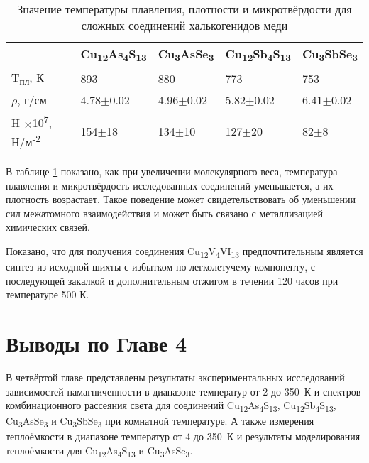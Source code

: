 \begin{table} [htbp]%
    \centering
	\caption{Значение температуры плавления, плотности и микротвёрдости для сложных соединений халькогенидов меди}%
	\label{hard}%
    \renewcommand{\arraystretch}{1.5}
	\begin{tabular}{@{}@{\extracolsep{20pt}}lllll@{}}
        \toprule     %
    	 & Cu\textsubscript{12}As\textsubscript{4}S\textsubscript{13} &Cu\textsubscript{3}AsSe\textsubscript{3}& Cu\textsubscript{12}Sb\textsubscript{4}S\textsubscript{13} &Cu\textsubscript{3}SbSe\textsubscript{3}	\\
        \midrule
    T\textsubscript{пл}, К & 893 & 880												& 773& 753	\\ \hline
    	$ \rho$, г/см 	&  4.78$\pm$0.02	 						& 4.96$\pm$0.02												&5.82$\pm$0.02 	& 6.41$\pm$0.02 \\ \hline
    	H $\times$10\textsuperscript{7}, Н/м\textsuperscript{-2} 	& 154$\pm$18	 						& 134$\pm$10 	& 127$\pm$20			& 82$\pm$8	\\ \hline

        \bottomrule
	\end{tabular}%
\end{table}
В таблице \ref{hard} показано, как при увеличении молекулярного веса, температура плавления и микротвёрдость исследованных соединений уменьшается, а их плотность возрастает. Такое поведение может свидетельствовать об уменьшении сил межатомного взаимодействия и может быть связано с металлизацией химических
связей.

Показано, что для получения соединения Cu\textsubscript{12}V\textsubscript{4}VI\textsubscript{13} предпочтительным является синтез из
исходной шихты с избытком по легколетучему компоненту, с последующей закалкой и
дополнительным отжигом в течении 120 часов при температуре 500 К.
\clearpage

\newpage

\section{Выводы по Главе 4} \label{sect4_5}

В четвёртой главе представлены результаты экспериментальных исследований зависимостей намагниченности в диапазоне температур от 2 до 350~К и спектров комбинационного рассеяния света для соединений Cu\textsubscript{12}As\textsubscript{4}S\textsubscript{13}, Cu\textsubscript{12}Sb\textsubscript{4}S\textsubscript{13}, Cu\textsubscript{3}AsSe\textsubscript{3} и Cu\textsubscript{3}SbSe\textsubscript{3} при комнатной температуре. А также измерения теплоёмкости в диапазоне температур от 4 до 350~К и результаты моделирования теплоёмкости для Cu\textsubscript{12}As\textsubscript{4}S\textsubscript{13} и Cu\textsubscript{3}AsSe\textsubscript{3}.

